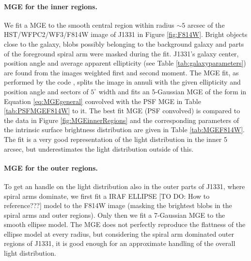 \paragraph{MGE for the inner regions.} We fit a MGE to the smooth central region within radius $\sim 5$ arcsec of the HST/WFPC2/WF3/F814W image of J1331 in Figure \ref{fig:F814W}. Bright objects  close to the galaxy, blobs possibly belonging to the background galaxy and parts of the foreground spiral arm were masked during the fit. J1331's galaxy center, position angle and average apparent ellipticity (see Table \ref{tab:galaxyparameters}) are found from the images weighted first and second moment. The MGE fit, as performed by the code \cite{Cap02}, splits the image in annuli with the given ellipticity and position angle and sectors of $5^\circ$ width and fits an 5-Gaussian MGE of the form in Equation \ref{eq:MGEgeneral} convolved with the PSF MGE in Table \ref{tab:PSFMGEF814W} to it. The best fit MGE (PSF convolved) is compared to the data in Figure \ref{fig:MGEinnerRegions} and the corresponding parameters of the intrinsic surface brightness distribution are given in Table \ref{tab:MGEF814W}. The fit is a very good representation of the light distribution in the inner 5 arcsec, but underestimates the light distribution outside of this.

\paragraph{MGE for the outer regions.} To get an handle on the light distribution also in the outer parts of J1331, where spiral arms dominate, we first fit a IRAF ELLIPSE [TO DO: How to reference???] model to the F814W image (masking the brightest blobs in the spiral arms and outer regions). Only then we fit a 7-Gaussian MGE to the smooth ellipse model. The MGE does not perfectly reproduce the flattness of the ellipse model at every radius, but considering the spiral arm dominated outer regions of J1331, it is good enough for an approximate handling of the overall light distribution.

